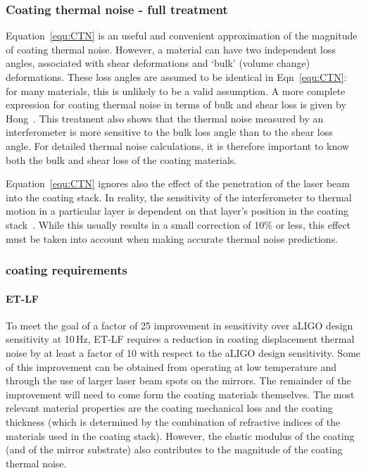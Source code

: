 \subsubsection{Coating thermal noise - full treatment}

Equation~\ref{equ:CTN} is an useful and convenient approximation of the magnitude of coating thermal noise. However, a material can have two independent loss angles, associated with shear deformations and `bulk' (volume change) deformations. These loss angles are assumed to be identical in Eqn~\ref{equ:CTN}: for many materials, this is unlikely to be a valid assumption. A more complete expression for coating thermal noise in terms of bulk and shear loss is given by Hong~\cite{Hong2013}. This treatment also shows that the thermal noise measured by an interferometer is more sensitive to the bulk loss angle than to the shear loss angle. For detailed thermal noise calculations, it is therefore important to know both the bulk and shear loss of the coating materials.

Equation~\ref{equ:CTN} ignores also the effect of the penetration of the laser beam into the coating stack. In reality, the sensitivity of the interferometer to thermal motion in a particular layer is dependent on that layer's position in the coating stack~\cite{Hong2013,gurkowski2010,gorodetsky2008,kondratiev2011}. While this usually results in a small correction of 10$\%$ or less, this effect must be taken into account when making accurate thermal noise predictions.

\subsubsection{coating requirements}

\paragraph{ET-LF}
To meet the goal of a factor of 25 improvement in sensitivity over aLIGO design sensitivity at 10\,Hz, ET-LF requires a reduction in coating displacement thermal noise by at least a factor of 10 with respect to the aLIGO design  sensitivity. Some of this improvement can be obtained from operating at low temperature and through the use of larger laser beam spots on the mirrors. The remainder of the improvement will need to come form the coating materials themselves. The most relevant material properties are the coating mechanical loss and the coating thickness (which is determined by the combination of refractive indices of the materials used in the coating stack). However, the elastic modulus of the coating (and of the mirror substrate) also contributes to the magnitude of the coating thermal noise.

